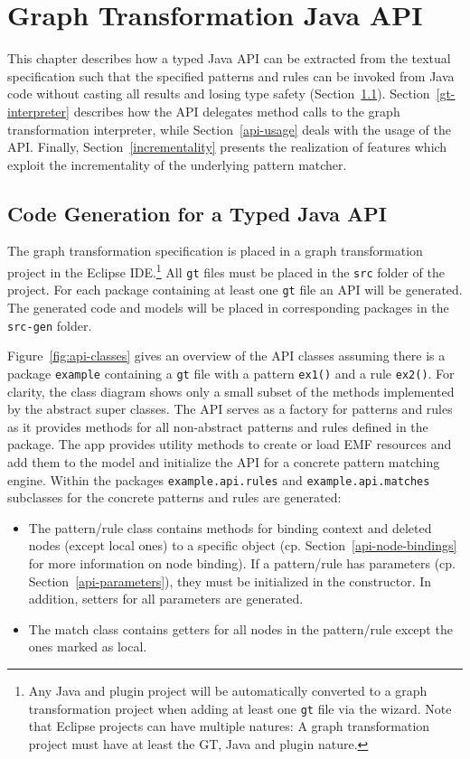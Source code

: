 
\chapter{Graph Transformation Java API}
\label{api}
This chapter describes how a typed Java API can be extracted from the textual specification such that the specified patterns and rules can be invoked from Java code without casting all results and losing type safety (Section~\ref{api-code-generation}).
Section~\ref{gt-interpreter} describes how the API delegates method calls to the graph transformation interpreter, while Section~\ref{api-usage} deals with the usage of the API.
Finally, Section~\ref{incrementality} presents the realization of features which exploit the incrementality of the underlying pattern matcher.

\section{Code Generation for a Typed Java API}
\label{api-code-generation}
The graph transformation specification is placed in a graph transformation project in the Eclipse IDE.\footnote{Any Java and plugin project will be automatically converted to a graph transformation project when adding at least one \texttt{gt} file via the wizard.
	Note that Eclipse projects can have multiple natures: A graph transformation project must have at least the GT, Java and plugin nature.}
All \texttt{gt} files must be placed in the \texttt{src} folder of the project.
For each package containing at least one \texttt{gt} file an API will be generated.
The generated code and models will be placed in corresponding packages in the \texttt{src-gen} folder.

Figure~\ref{fig:api-classes} gives an overview of the API classes assuming there is a package \texttt{example} containing a \texttt{gt} file with a pattern \texttt{ex1()} and a rule \texttt{ex2()}.
For clarity, the class diagram shows only a small subset of the methods implemented by the abstract super classes.
The API serves as a factory for patterns and rules as it provides methods for all non-abstract patterns and rules defined in the package.
The app provides utility methods to create or load EMF resources and add them to the model and initialize the API for a concrete pattern matching engine.
Within the packages \texttt{example.api.rules} and \texttt{example.api.matches} subclasses for the concrete patterns and rules are generated:
\begin{itemize}
	\item The pattern/rule class contains methods for binding context and deleted nodes (except local ones) to a specific object (cp. Section~\ref{api-node-bindings} for more information on node binding).
	If a pattern/rule has parameters (cp. Section~\ref{api-parameters}), they must be initialized in the constructor.
	In addition, setters for all parameters are generated.
	\item The match class contains getters for all nodes in the pattern/rule except the ones marked as local.
\end{itemize}

